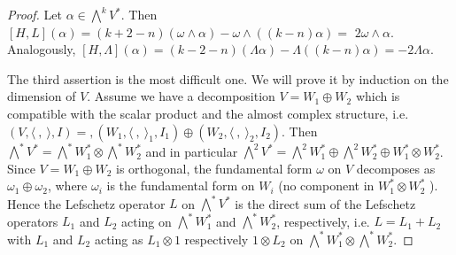 \begin{proof}
  Let $\alpha \in \bigwedge^k V^*$. Then $[H, L](\alpha)=(k+2-n)(\omega \wedge \alpha)-\omega \wedge((k-n) \alpha)=$ $2 \omega \wedge \alpha$. Analogously, $[H, \Lambda](\alpha)=(k-2-n)(\Lambda \alpha)-\Lambda((k-n) \alpha)=-2 \Lambda \alpha$.
  
The third assertion is the most difficult one. We will prove it by induction on the dimension of $V$. Assume we have a decomposition $V=W_1 \oplus W_2$ which is compatible with the scalar product and the almost complex structure, i.e. $(V,\langle~,~\rangle, I)=,\left(W_1,\langle~,~\rangle_1 , I_1\right) \oplus\left(W_2,\langle~,~\rangle_2, I_2\right)$. Then $\bigwedge^* V^*=\bigwedge^* W_1^* \otimes \bigwedge^* W_2^*$ and in particular $\bigwedge^2 V^*=\bigwedge^2 W_1^* \oplus \bigwedge^2 W_2^* \oplus W_1^* \otimes W_2^*$. Since $V=W_1 \oplus W_2$ is orthogonal, the fundamental form $\omega$ on $V$ decomposes as $\omega_1 \oplus \omega_2$, where $\omega_i$ is the fundamental form on $W_i$ (no component in $W_1^* \otimes W_2^*$ ). Hence the Lefschetz operator $L$ on $\bigwedge^* V^*$ is the direct sum of the Lefschetz operators $L_1$ and $L_2$ acting on $\bigwedge^* W_1^*$ and $\bigwedge^* W_2^*$, respectively, i.e. $L=L_1+L_2$ with $L_1$ and $L_2$ acting as $L_1 \otimes 1$ respectively $1 \otimes L_2$ on $\bigwedge^* W_1^* \otimes \bigwedge^* W_2^*$.


\end{proof}
